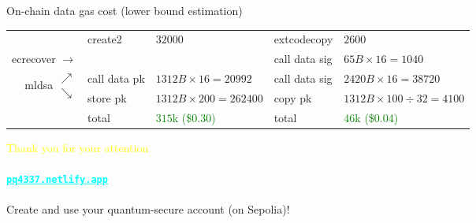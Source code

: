 \documentclass[aspectratio=1610]{beamer}
\newcommand{\link}[2]{\href{#1}{\textcolor{cyan}{\underline{\texttt{#2}}}}}
\begin{document}
\begin{frame}{On-chain data gas cost (lower bound estimation)}
\begin{tabular}{|r|l>{\raggedleft\arraybackslash}p{4cm}|l>{\raggedleft\arraybackslash}p{4.3cm}|}
    \hline
    & {\tiny create2} & $32000$ & {\tiny extcodecopy} & $2600$\\
    {\tiny ecrecover $\to$} & & & {\tiny call data sig} & $65B \times 16 = 1040$ \\
    \multirow{2}{*}{{\tiny mldsa $\left.\begin{array}{l} \nearrow \\ \searrow \end{array}\right.$}} & {\tiny call data pk} & $1312B \times 16 = 20 992$ & {\tiny call data sig} & $2420B \times 16 = 38 720$ \\
    & {\tiny store pk} & $1312B \times 200 = 262 400$ & {\tiny copy pk} & $1312B \times 100 \div 32 = 4100$\\
    & {\tiny total} & \textcolor{green}{$315$k {\tiny (\$0.30)}} & {\tiny total} & \textcolor{green}{$46$k {\tiny (\$0.04)}}\\
    \hline
  \end{tabular}
\end{frame}

\begin{frame}
  \begin{center}
    \textcolor{yellow}{Thank you for your attention}\\
    \ \\
    \textbf{\link{https://pq4337.netlify.app/}{pq4337.netlify.app}}\\
    \ \\
    Create and use your quantum-secure account (on Sepolia)!
  \end{center}
\end{frame}
\end{document}

